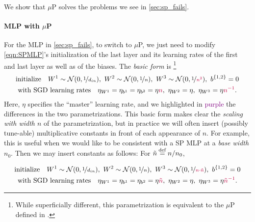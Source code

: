 \documentclass{article}
\theoremstyle{definition}
\newcommand{\highlight}[1]{\textcolor{purple}{#1}}
\begin{document}
We show that $\mu$P solves the problems we see in \cref{sec:sp_fails}.

\paragraph{MLP with $\mu$P}
For the MLP in \cref{sec:sp_fails}, to switch to $\mu$P, we just need to modify \cref{eqn:SPMLP}'s initialization of the last layer and its learning rates of the first and last layer as well as of the biases.
The \emph{basic form} is%
\footnote{
  While superficially different, this parametrization is equivalent to the $\mu$P defined in \citep{TP4}.
}
\begin{equation}
  \begin{gathered}
  \text{initialize}\quad
        W^1\sim\mathcal{N}(0, \nicefrac{1}{d_{in}}),\ 
        W^{2}\sim\mathcal{N}(0, \nicefrac{1}{n}),\ 
        W^3 \sim \Gaus(0, \nicefrac 1 {\highlight{n^2}}),\ 
        b^{\{1,2\}}=0
        \\
  \text{with SGD learning rates}\quad
        \eta_{W^1} = \eta_{b^1} = \eta_{b^2} = \eta \highlight{n},\ 
        \eta_{W^2} = \eta,\ 
        \eta_{W^3} = \eta \highlight{n^{-1}}.
  \end{gathered}
  \label{eqn:MUPMLP}
\end{equation}
Here, $\eta$ specifies the ``master'' learning rate, and we highlighted in \highlight{purple} the differences in the two parametrizations.
This basic form makes clear the \emph{scaling with width $n$} of the parametrization, but in practice we will often insert (possibly tune-able) multiplicative constants in front of each appearance of $n$.
For example, this is useful when we would like to be consistent with a SP MLP at a \emph{base width} $n_0$.
Then we may insert constants as follows: For  $\tilde n \mathbin{\overset{\mathrm{def}}{=}} n / n_0$,

\begin{equation}
  \begin{gathered}
  \text{initialize}\quad
        W^1\sim\mathcal{N}(0, \nicefrac{1}{d_{in}}),\ 
        W^{2}\sim\mathcal{N}(0, \nicefrac{1}{n}),\ 
        W^3 \sim \Gaus(0, \nicefrac 1 {\highlight{n \cdot \tilde n}}),\ 
        b^{\{1,2\}}=0
        \\
  \text{with SGD learning rates}\quad
        \eta_{W^1} = \eta_{b^1} = \eta_{b^2} = \eta \highlight{\tilde n},\ 
        \eta_{W^2} = \eta,\ 
        \eta_{W^3} = \eta \highlight{\tilde n^{-1}}.
  \end{gathered}
  \label{eqn:MUPMLP_basewidth}
\end{equation}
\end{document}
